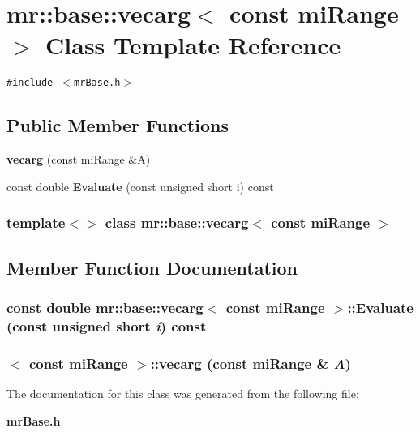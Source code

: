 \section{mr::base::vecarg$<$ const mi\-Range $>$ Class Template Reference}
\label{classmr_1_1base_1_1vecarg_3_01const_01miRange_01_4}
{\tt \#include $<$mr\-Base.h$>$}

\subsection*{Public Member Functions}
\begin{CompactItemize}
\item 
{\bf vecarg} (const mi\-Range \&A)
\item 
const double {\bf Evaluate} (const unsigned short i) const 
\end{CompactItemize}
\subsubsection*{template$<$$>$ class mr::base::vecarg$<$ const mi\-Range $>$}



\subsection{Member Function Documentation}
\subsubsection{\setlength{\rightskip}{0pt plus 5cm}const double {\bf mr::base::vecarg}$<$ const mi\-Range $>$::Evaluate (const unsigned short {\em i}) const\hspace{0.3cm}{\tt  [inline]}}\label{classmr_1_1base_1_1vecarg_3_01const_01miRange_01_4_a1}


\subsubsection{$<$ const mi\-Range $>$::{\bf vecarg} (const mi\-Range \& {\em A})\hspace{0.3cm}{\tt  [inline]}}\label{classmr_1_1base_1_1vecarg_3_01const_01miRange_01_4_a0}




The documentation for this class was generated from the following file:\begin{CompactItemize}
\item 
{\bf mr\-Base.h}\end{CompactItemize}
